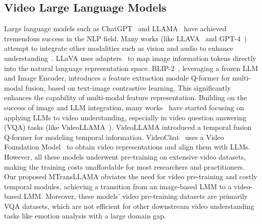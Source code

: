 \subsection{Video Large Language Models}

Large language models such as ChatGPT~\cite{liu2023summary} and LLAMA~\cite{touvron2023llama} have achieved tremendous success in the NLP field. Many works (like LLAVA~\cite{liu2023visual} and GPT-4~\cite{liu2023summary}) attempt to integrate other modalities such as vision and audio to enhance understanding~\cite{chai2022deep,wang2023user}. LLaVA uses adapters~\cite{he2021effectiveness} to map image information tokens directly into the natural language representation space. BLIP-2~\cite{li2023blip}, leveraging a frozen LLM and Image Encoder, introduces a feature extraction module Q-former for multi-modal fusion, based on text-image contrastive learning. This significantly enhances the capability of multi-modal feature representation. Building on the success of image and LLM integration, many works~\cite{song2023moviechat,maaz2023video,zhang2023video} have started focusing on applying LLMs to video understanding, especially in video question answering (VQA) tasks (like VideoLLAMA~\cite{zhang2023video}). VideoLLAMA introduced a temporal fusion Q-former for modeling temporal information. VideoChat~\cite{maaz2023video} uses a Video Foundation Model~\cite{arnab2021vivit} to obtain video representations and align them with LLMs. However, all these models underwent pre-training on extensive video datasets, making the training costs unaffordable for most researchers and practitioners. Our proposed MTransLLAMA obviates the need for video pre-training and costly temporal modules, achieving a transition from an image-based LMM to a video-based LMM. Moreover, these models' video pre-training datasets are primarily VQA datasets, which are not efficient for other downstream video understanding tasks like emotion analysis with a large domain gap.



